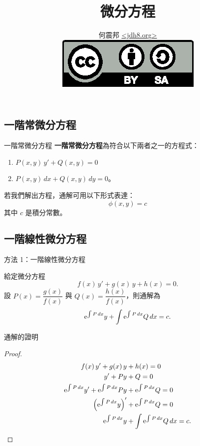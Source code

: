 \documentclass{beamer}
\title{微分方程}
\author[何震邦]{何震邦 \href{http://jdh8.org/}{\textless jdh8.org\textgreater}\\
    \href{http://creativecommons.org/licenses/by-sa/3.0/tw/deed.zh\textunderscore TW}{\includegraphics{by-sa.eps}}}
\newcommand  {\e}{\textup e}
\theoremstyle{remark}
\begin{document}
\begin{CJK}{UTF8}{bsmi}
\maketitle

\section[一階 ODE]{一階常微分方程}
\begin{frame}{一階常微分方程}
  \textbf{一階常微分方程}為符合以下兩者之一的方程式：
  \begin{enumerate}
    \item $P(x,y)\,y' + Q(x,y) = 0$
    \item $P(x,y)\,dx + Q(x,y)\,dy = 0$。
  \end{enumerate}
  若我們解出方程，通解可用以下形式表達：
  \[\phi(x,y) = c\]
  其中 $c$ 是積分常數。
\end{frame}

\subsection[線性]{一階線性微分方程}
\begin{frame}{方法 1：一階線性微分方程}
  \begin{theorem}
    給定微分方程
    \[f(x)\,y' + g(x)\,y + h(x) = 0.\]
    設 $P(x) = \dfrac{g(x)}{f(x)}$ 與 $Q(x) = \dfrac{h(x)}{f(x)}$，則通解為
    \[\e^{\int P\,dx} y + \int \e^{\int P\,dx} Q\,dx = c.\]
  \end{theorem}
\end{frame}

\begin{frame}{通解的證明}
  \begin{proof}
    \begin{align*}
      f(x)\,y' + g(x)\,y &+ h(x) = 0\\
      y' + Py &+ Q = 0\\
      \e^{\int P\,dx} y' + \e^{\int P\,dx} Py &+ \e^{\int P\,dx} Q = 0\\
      \left( \e^{\int P\,dx} y \right)' &+ \e^{\int P\,dx} Q = 0\\
      \e^{\int P\,dx} y &+ \int \e^{\int P\,dx} Q\,dx = c. \qedhere
    \end{align*}
  \end{proof}
\end{frame}


\end{CJK}
\end{document}
